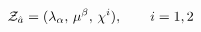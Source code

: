 \begin{equation}\label{25}
{\cal Z}_{\hat a}=(\lambda_\alpha,\,\mu^\beta,\, \chi^i), \qquad
i=1,2
\end{equation}

